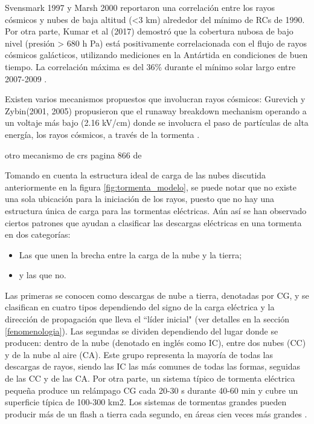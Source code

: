 \documentclass[12pt,oneside,openany,letter]{book}
\begin{document}
Svensmark 1997 y Marsh 2000 reportaron una correlación entre los rayos cósmicos y nubes de baja altitud (<3 km) alrededor del mínimo de RCs de 1990. Por otra parte, Kumar et al (2017) demostró que la cobertura nubosa de bajo nivel (presión > 680 h Pa) está positivamente correlacionada con el flujo de rayos cósmicos galácticos, utilizando mediciones en la Antártida en condiciones de buen tiempo. La correlación máxima es del 36\% durante el mínimo solar largo entre 2007-2009 \cite{KumarEtal2018}. 

Existen varios mecanismos propuestos que involucran rayos cósmicos: 
Gurevich y Zybin(2001, 2005) propusieron que el runaway breakdown mechanism operando a un voltaje más bajo (2.16 kV/cm) donde se involucra el paso de partículas de alta energía, los rayos cósmicos, a través de la tormenta  \cite{KumarEtal2018}. 

otro mecanismo de crs pagina 866 de \cite{KumarEtal2018}

Tomando en cuenta la estructura ideal de carga de las nubes discutida anteriormente en la figura \ref{fig:tormenta_modelo}, se puede notar  que no existe una sola ubicación para la iniciación de los rayos, puesto que no hay una estructura única de carga para las tormentas eléctricas. Aún así se han observado ciertos patrones que ayudan a clasificar las descargas eléctricas en una tormenta en dos categorías: 
\begin{itemize}
    \item Las que unen la brecha entre la carga de la nube y la tierra;
    \item y las que no. 
\end{itemize}

Las primeras se conocen como descargas de nube a tierra, denotadas por CG, y se clasifican en cuatro tipos dependiendo del signo de la carga eléctrica y la dirección de propagación que lleva el ``líder inicial" (ver detalles en la sección \ref{fenomenologia}). Las segundas se dividen dependiendo del lugar donde se producen: dentro de la nube (denotado en inglés como IC), entre dos nubes (CC) y de la nube al aire (CA). Este grupo representa la mayoría de todas las descargas de rayos, siendo las IC las más comunes de todas las formas, seguidas de las CC y de las CA. Por otra parte, un sistema típico de tormenta eléctrica pequeña produce un relámpago CG cada 20-30 s durante 40-60 min y cubre un superficie típica de 100-300 km2. Los sistemas de tormentas grandes pueden producir más de un flash a tierra cada segundo, en áreas cien veces más grandes \cite{DwyerUman2014}. 
\end{document}
